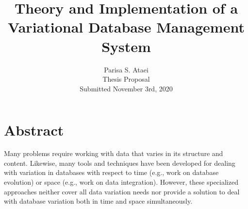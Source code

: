 \documentclass[11pt]{article}
\begin{document}
\title{Theory and Implementation of a Variational Database Management System}

\author{Parisa S. Ataei\\
Thesis Proposal \\
Submitted November 3rd, 2020
}
\date{}

\maketitle

\section*{Abstract}
Many problems require working with data that varies in its structure and content. Likewise, many tools and techniques have been developed for dealing with variation in databases with respect to time (e.g., work on database evolution) or space (e.g., work on data integration).
However, these specialized approaches neither cover all data variation needs nor provide a solution to deal with database variation both in time and space simultaneously.
\end{document}
